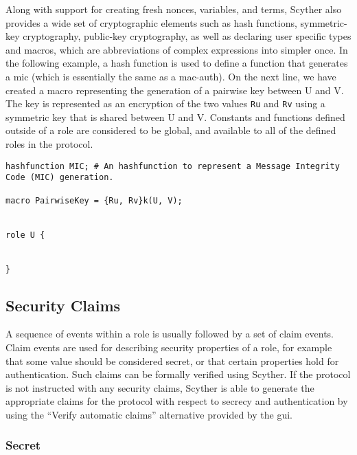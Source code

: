 Along with support for creating fresh nonces, variables, and terms, Scyther also provides a wide set of cryptographic elements such as hash functions, symmetric-key cryptography, public-key cryptography, as well as declaring user specific types and macros, which are abbreviations of complex expressions into simpler once. In the following example, a hash function is used to define a function that generates a \gls{mic} (which is essentially the same as a \gls{mac-auth}). On the next line, we have created a macro representing the generation of a pairwise key between U and V. The key is represented as an encryption of the two values \texttt{Ru} and \texttt{Rv} using a symmetric key that is shared between U and V. Constants and functions defined outside of a role are considered to be global, and available to all of the defined roles in the protocol.\newline

\begin{lstlisting}
hashfunction MIC; # An hashfunction to represent a Message Integrity Code (MIC) generation.

macro PairwiseKey = {Ru, Rv}k(U, V);


role U {


}
\end{lstlisting}


\subsection{Security Claims}

A sequence of events within a role is usually followed by a set of claim events. Claim events are used for describing security properties of a role, for example that some value should be considered secret, or that certain properties hold for authentication. Such claims can be formally verified using Scyther. If the protocol is not instructed with any security claims, Scyther is able to generate the appropriate claims  for the protocol with respect to secrecy and authentication by using the ``Verify automatic claims'' alternative provided by the \gls{gui}.

\subsubsection{Secret}


